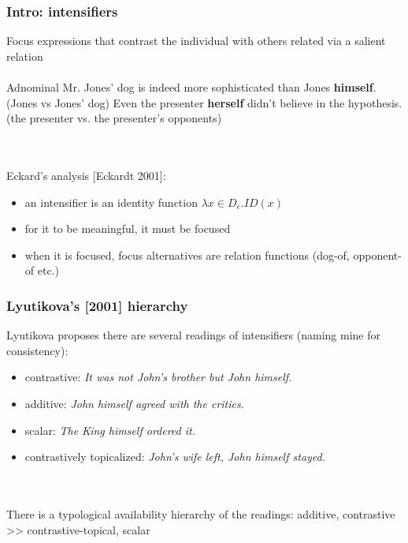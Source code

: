 \documentclass{beamer}
\begin{document}
\begin{frame}
    \frametitle{Intro: intensifiers}

    Focus expressions that contrast the individual with others related via a salient relation\\~\\

    Adnominal
    \pex
        \a Mr. Jones’ dog is indeed more sophisticated than Jones \textbf{himself}. (Jones vs Jones’ dog)
        \a Even the presenter \textbf{herself} didn’t believe in the hypothesis. (the presenter vs. the presenter’s opponents)
    \xe

    
    \pause

    ~\\~\\Eckard's analysis [Eckardt 2001]:

    \begin{itemize}
        \item an intensifier is an identity function $\lambda x \in D_e. ID(x)$
        \item for it to be meaningful, it must be focused
        \item when it is focused, focus alternatives are relation functions (dog-of, opponent-of etc.)
    \end{itemize}


\end{frame}

\begin{frame}
    \frametitle{Lyutikova's [2001] hierarchy}

    Lyutikova proposes there are several readings of intensifiers (naming mine for consistency):

    \begin{itemize}
        \item contrastive: \textit{It was not John's brother but John himself.}
        \item additive: \textit{John himself agreed with the critics.}
        \item scalar: \textit{The King himself ordered it.}
        \item contrastively topicalized: \textit{John's wife left, John himself stayed.}
    \end{itemize}

    ~\\~\\There is a typological availability hierarchy of the readings:
    \ex additive, contrastive >> contrastive-topical, scalar \xe
\end{frame}
\end{document}
